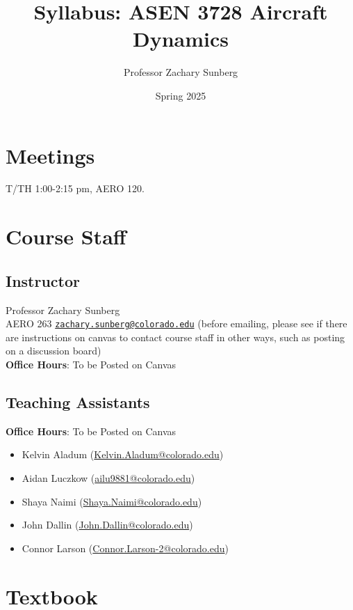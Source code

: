 \documentclass[9pt]{article}
\title{Syllabus: ASEN 3728 Aircraft Dynamics}
\author{Professor Zachary Sunberg}
\date{Spring 2025}
\begin{document}
\maketitle

\section*{Meetings}

T/TH 1:00-2:15 pm, AERO 120.

\section*{Course Staff}

\subsection*{Instructor}
Professor Zachary Sunberg\\
AERO 263 \href{mailto://zachary.sunberg@colorado.edu}{\nolinkurl{zachary.sunberg@colorado.edu}} (before emailing, please see if there are instructions on canvas to contact course staff in other ways, such as posting on a discussion board)\\
\textbf{Office Hours}: To be Posted on Canvas

\subsection*{Teaching Assistants}

\textbf{Office Hours}: To be Posted on Canvas

\begin{itemize}[noitemsep]
    \item Kelvin Aladum (\href{mailto://Kelvin.Aladum@colorado.edu}{Kelvin.Aladum@colorado.edu})
    \item Aidan Luczkow (\href{mailto://ailu9881@colorado.edu}{ailu9881@colorado.edu})
    \item Shaya Naimi (\href{mailto://Shaya.Naimi@colorado.edu}{Shaya.Naimi@colorado.edu})
    \item John Dallin (\href{mailto://john.dallin@colorado.edu}{John.Dallin@colorado.edu})
    \item Connor Larson (\href{mailto://Connor.Larson-2@colorado.edu}{Connor.Larson-2@colorado.edu})
\end{itemize}

\section*{Textbook}
\end{document}
